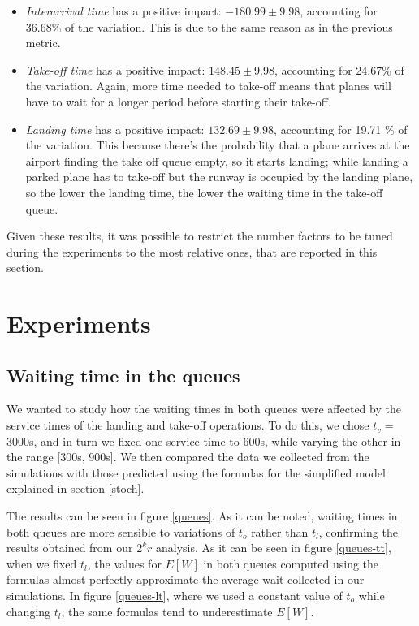 \documentclass[12pt]{article}
\begin{document}
\begin{itemize}
    \item \textit{Interarrival time} has a positive impact: $-180.99 \pm  9.98 $, accounting for 36.68\% of the variation. This is due to the same reason as in the previous metric. 
    \item \textit{Take-off time} has a positive impact: $ 148.45 \pm  9.98 $, accounting for 24.67\% of the variation. Again, more time needed to take-off means that planes will have to wait for a longer period before starting their take-off. 
    \item \textit{Landing time} has a positive impact: $ 132.69 \pm 9.98 $, accounting for 19.71 \% of the variation. This because there's the probability that a plane arrives at the airport finding the take off queue empty, so it starts landing; while landing a parked plane has to take-off but the runway is occupied by the landing plane, so the lower the landing time, the lower the waiting time in the take-off queue. 
\end{itemize}

Given these results, it was possible to restrict the number factors to be tuned during the experiments to the most relative ones, that are reported in this section. 

\section{Experiments}

\subsection{Waiting time in the queues}

We wanted to study how the waiting times in both queues were affected by the service times of the landing and take-off operations. To do this, we chose $t_v=$3000s, and in turn we fixed one service time to 600s, while varying the other in the range [300s, 900s]. We then compared the data we collected from the simulations with those predicted using the formulas for the simplified model explained in section \ref{stoch}.

The results can be seen in figure \ref{queues}. As it can be noted, waiting times in both queues are more sensible to variations of $t_o$ rather than $t_l$, confirming the results obtained from our $2^kr$ analysis. As it can be seen in figure \ref{queues-tt}, when we fixed $t_l$, the values for $E[W]$ in both queues computed using the formulas almost perfectly approximate the average wait collected in our simulations. In figure \ref{queues-lt}, where we used a constant value of $t_o$ while changing $t_l$, the same formulas tend to underestimate $E[W]$.
\end{document}
